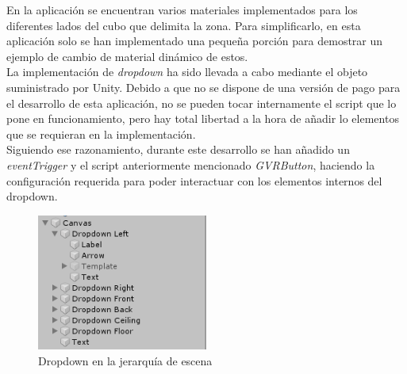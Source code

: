 
\quad En la aplicación se encuentran varios materiales implementados para los diferentes lados del cubo que delimita la zona. Para simplificarlo, en esta aplicación solo se han implementado una pequeña porción para demostrar un ejemplo de cambio de material dinámico de estos.\\

\quad La implementación de \textit{dropdown} ha sido llevada a cabo mediante el objeto suministrado por Unity. Debido a que no se dispone de una versión de pago para el desarrollo de esta aplicación, no se pueden tocar internamente el script que lo pone en funcionamiento, pero hay total libertad a la hora de añadir lo elementos que se requieran en la implementación.\\

\quad Siguiendo ese razonamiento, durante este desarrollo se han añadido un \textit{eventTrigger} y el script anteriormente mencionado \textit{GVRButton}, haciendo la configuración requerida para poder interactuar con los elementos internos del dropdown.\\

\begin{figure}[htb]
	\centering
	\includegraphics[width=0.5\textwidth]{./imagenes/dropdown}
	\caption{Dropdown en la jerarquía de escena}
\end{figure}
\FloatBarrier

